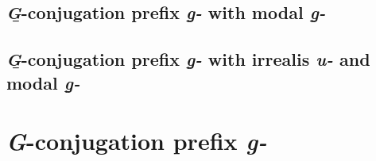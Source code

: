 \documentclass[12pt,letterpaper,landscape,oneside,article]{memoir}
\begin{document}
\subsection{\textit{G̱}-conjugation prefix \textit{g̱-} with modal \textit{g̱-}}

\subsection{\textit{G̱}-conjugation prefix \textit{g̱-} with irrealis \textit{u-} and modal \textit{g̱-}}

\clearpage
\section{\textit{G}-conjugation prefix \textit{g-}}
\end{document}
